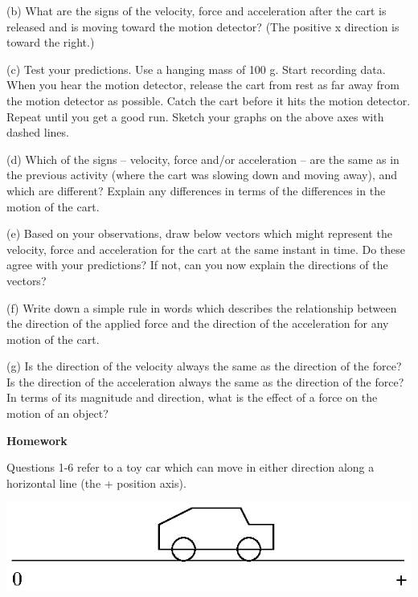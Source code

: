 (b) What are the signs of the velocity, force and acceleration after the cart
is released and is moving toward the motion detector? (The positive x direction
is toward the right.)
\vspace{20mm}

(c) Test your predictions. Use a hanging mass of 100 g. Start recording data.
When you hear the motion detector, release the cart from rest as far away from
the motion detector as possible. Catch the cart before it hits the motion detector.
Repeat until you get a good run. Sketch your graphs on the above axes with dashed
lines.

(d) Which of the signs -- velocity, force and/or acceleration -- are the same as
in the previous activity (where the cart was slowing down and moving away), and
which are different? Explain any differences in terms of the differences in
the motion of the cart.
\vspace{20mm}

(e) Based on your observations, draw below vectors which might represent the
velocity, force and acceleration for the cart at the same instant in time. Do
these agree with your predictions? If not, can you now explain the directions
of the vectors?
\vspace{30mm}

(f) Write down a simple rule in words which describes the relationship between
the direction of the applied force and the direction of the acceleration for
any motion of the cart.
\vspace{20mm}

(g) Is the direction of the velocity always the same as the direction of the
force? Is the direction of the acceleration always the same as the direction
of the force? In terms of its magnitude and direction, what is the effect of
a force on the motion of an object?
\vspace{20mm}

\textbf{Homework }

Questions 1-6 refer to a toy car which can move in either direction along a
horizontal line (the + position axis).

\vspace{0.3cm}
{\par\centering \includegraphics{force2_fig6.eps} \par}
\vspace{0.3cm}

